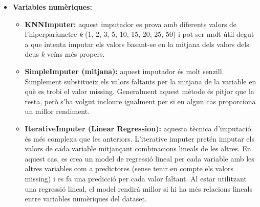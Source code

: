 \begin{itemize}
	\item \textbf{Variables numèriques:}
		\begin{itemize}
		\item \textbf{KNNImputer:} aquest imputador es prova amb diferents valors de l'hiperparàmetre \textit{k} (1, 2, 3, 5, 10, 15, 20, 25, 50) i pot ser molt útil degut a que intenta imputar els valors basant-se en la mitjana dels valors dels deus \textit{k} veïns més propers.
		
		\item \textbf{SimpleImputer (mitjana):} aquest imputador és molt senzill. Simplement substitueix els valors faltants per la mitjana de la variable en què es trobi el valor missing. Generalment aquest mètode és pitjor que la resta, però s'ha volgut incloure igualment per si en algun cas proporciona un millor rendiment.
		
		\item \textbf{IterativeImputer (Linear Regression):} aquesta tècnica d'imputació és més complexa que les anteriors. L'iterative imputer pretén imputar els valors de cada variable mitjançant combinacions lineals de les altres. En aquest cas, es crea un model de regressió lineal per cada variable amb les altres variables com a predictores (sense tenir en compte els valors missing) i es fa una predicció per cada valor faltant. Al estar utilitzant una regressió lineal, el model rendirà millor si hi ha més relacions lineals entre variables numèriques del dataset.
		\end{itemize}


\end{itemize}
